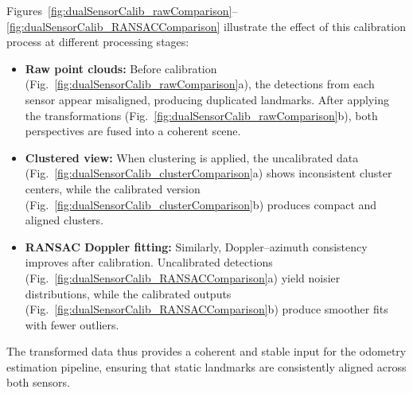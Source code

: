 Figures~\ref{fig:dualSensorCalib_rawComparison}--\ref{fig:dualSensorCalib_RANSACComparison} illustrate the effect of this calibration process at different processing stages: 
\begin{itemize} 
    \item \textbf{Raw point clouds:} Before calibration (Fig.~\ref{fig:dualSensorCalib_rawComparison}a), the detections from each sensor appear misaligned, producing duplicated landmarks. After applying the transformations (Fig.~\ref{fig:dualSensorCalib_rawComparison}b), both perspectives are fused into a coherent scene. 
    \item \textbf{Clustered view:} When clustering is applied, the uncalibrated data (Fig.~\ref{fig:dualSensorCalib_clusterComparison}a) shows inconsistent cluster centers, while the calibrated version (Fig.~\ref{fig:dualSensorCalib_clusterComparison}b) produces compact and aligned clusters. 
    \item \textbf{RANSAC Doppler fitting:} Similarly, Doppler–azimuth consistency improves after calibration. Uncalibrated detections (Fig.~\ref{fig:dualSensorCalib_RANSACComparison}a) yield noisier distributions, while the calibrated outputs (Fig.~\ref{fig:dualSensorCalib_RANSACComparison}b) produce smoother fits with fewer outliers. 
\end{itemize} 

The transformed data thus provides a coherent and stable input for the odometry estimation pipeline, ensuring that static landmarks are consistently aligned across both sensors.  


